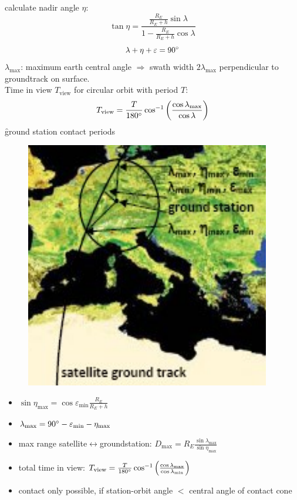 calculate nadir angle $\eta$:
\[ \tan \eta = \frac{\frac{R_E}{R_E+h}\sin \lambda}{1-\frac{R_E}{R_E+h}\cos\lambda}\]
\[ \lambda + \eta + \varepsilon = 90\degree \]
$\lambda_\text{max}$: maximum earth central angle $\Rightarrow$ swath width $2\lambda_\text{max}$ perpendicular to groundtrack on surface.\\
Time in view $T_\text{view}$ for circular orbit with period $T$:
\[ T_\text{view} = \frac{T}{180\degree}\cos^{-1}\left(\frac{\cos \lambda_\text{max}}{\cos \lambda}\right)\]
\f{ground station contact periods}
\begin{figure}[!ht]
 \centering
 \includegraphics[scale=0.6]{groundtrack}
\end{figure}
\begin{itemize}
 \item $\sin\eta_\text{max} = \cos \varepsilon_\text{min}\frac{R_E}{R_E+h}$
 \item $\lambda_\text{max} = 90\degree - \varepsilon_\text{min} -\eta_\text{max}$
 \item max range satellite$\leftrightarrow$groundstation: $D_\text{max} = R_E\frac{\sin\lambda_\text{max}}{\sin\eta_\text{max}}$
 \item total time in view: $ T_\text{view} = \frac{T}{180\degree}\cos^{-1}\left(\frac{\cos \lambda_\text{max}}{\cos \lambda_\text{min}}\right)$
 \item contact only possible, if station-orbit angle $<$ central angle of contact cone
\end{itemize}

